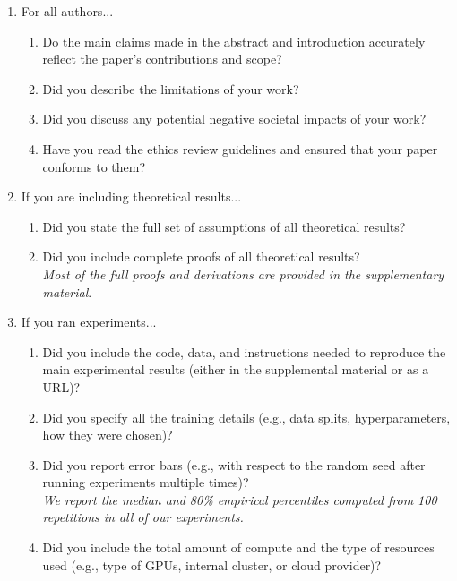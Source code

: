 \begin{enumerate}

\item For all authors...
\begin{enumerate}
  \item Do the main claims made in the abstract and introduction accurately reflect the paper's contributions and scope?
    \answerYes{}
  \item Did you describe the limitations of your work?
    \answerTODO{}
  \item Did you discuss any potential negative societal impacts of your work?
    \answerTODO{}
  \item Have you read the ethics review guidelines and ensured that your paper conforms to them?
    \answerTODO{}
\end{enumerate}

\item If you are including theoretical results...
\begin{enumerate}
  \item Did you state the full set of assumptions of all theoretical results?
    \answerYes{}
  \item Did you include complete proofs of all theoretical results?
    \answerYes{} \\
    \textit{Most of the full proofs and derivations are provided in the supplementary material}.
\end{enumerate}

\item If you ran experiments...
\begin{enumerate}
  \item Did you include the code, data, and instructions needed to reproduce the main experimental results (either in the supplemental material or as a URL)?
    \answerTODO{}
  \item Did you specify all the training details (e.g., data splits, hyperparameters, how they were chosen)?
    \answerTODO{}
	\item Did you report error bars (e.g., with respect to the random seed after running experiments multiple times)?
    \answerYes{} \\
    \textit{We report the median and 80\% empirical percentiles computed from 100 repetitions in all of our experiments.}
	\item Did you include the total amount of compute and the type of resources used (e.g., type of GPUs, internal cluster, or cloud provider)?
    \answerTODO{}
\end{enumerate}


\end{enumerate}
